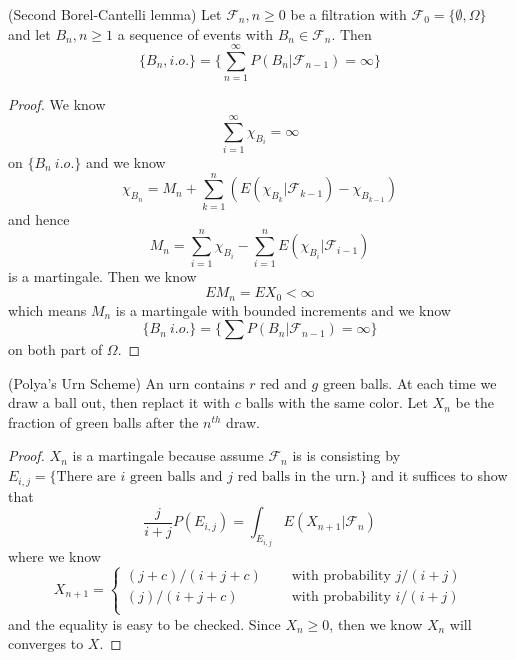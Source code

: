 \documentclass[lang=en, color=blue, ]{elegantbook}
\newcommand{\F}{\mathcal{F}}
\begin{document}
\begin{theorem}
    (Second Borel-Cantelli lemma) Let $\F_n,n\geq 0$ be a filtration with $\F_0 = \{\emptyset,\Omega\}$ and let $B_n, n\geq 1$ a sequence of events with $B_n \in \F_n$. Then
    \[\{B_n,i.o.\} = \{\sum\limits_{n=1}^{\infty}P(B_n|\F_{n-1}) = \infty\}\]
\end{theorem}
\begin{proof}
    We know
    \[
    \sum\limits_{i=1}^{\infty} \chi_{B_i} = \infty
    \]
    on $\{B_n\ i.o.\}$
    and we know
    \[
    \chi_{B_n} = M_n + \sum\limits_{k=1}^n (E(\chi_{B_k}|\F_{k-1})-\chi_{B_{k-1}})
    \]
    and hence
    \[
    M_n = \sum\limits_{i=1}^n \chi_{B_i} - \sum\limits_{i=1}^{n}E(\chi_{B_i}|\F_{i-1})
    \]
    is a martingale. Then we know
    \[
    EM_n = EX_0 <\infty
    \]
    which means $M_n$ is a martingale with bounded increments and we know
    \[
    \{B_n\ i.o.\} = \{\sum P(B_n|\F_{n-1})=\infty\}
    \]
    on both part of $\Omega$.
\end{proof}

\begin{example}
    (Polya's Urn Scheme) An urn contains $r$ red and $g$ green balls. At each time we draw a ball out, then replact it with $c$ balls with the same color. Let $X_n$ be the fraction of green balls after the $n^{th}$ draw. 
\end{example}
\begin{proof}\par
    $X_n$ is a martingale because assume $\F_n$ is is consisting by $E_{i,j} = \{\text{There are }i\text{ green balls and }j\text{ red balls in the urn.}\}$ and it suffices to show that
    \[
    \dfrac{j}{i+j}P(E_{i,j})
    = \int_{E_{i,j}}E(X_{n+1}|\F_n)
    \]
    where we know
    \[
    X_{n+1}=\begin{cases}
        (j+c)/(i+j+c)&\quad\text{ with probability }j/(i+j)\\
        (j)/(i+j+c)&\quad\text{ with probability }i/(i+j)\\
    \end{cases}
    \]
    and the equality is easy to be checked. Since $X_n \geq 0$, then we know $X_n$ will converges to $X$.
\end{proof}
\end{document}
